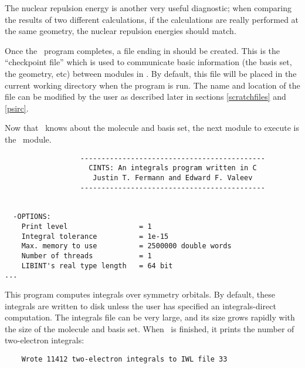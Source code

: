 The nuclear repulsion energy is another very useful diagnostic; when
comparing the results of two different calculations, if the calculations
are really performed at the same geometry, the nuclear repulsion energies
should match.

Once the \PSIinput\ program completes, a file ending in  should
be created.  This is the ``checkpoint file'' which is used to communicate
basic information (the basis set, the geometry, etc) between modules
in \PSIthree.  By default, this file will be placed in the current working
directory when the program is run.  The name and location of the file can
be modified by the user as described later in sections \ref{scratchfiles}
and \ref{psirc}.

Now that \PSIthree\ knows about the molecule and basis set, the next
module to execute is the \PSIcints\ module.  
\begin{verbatim}
                  --------------------------------------------
                    CINTS: An integrals program written in C
                     Justin T. Fermann and Edward F. Valeev
                  --------------------------------------------
                                                                                
                                                                                
  -OPTIONS:
    Print level                 = 1
    Integral tolerance          = 1e-15
    Max. memory to use          = 2500000 double words
    Number of threads           = 1
    LIBINT's real type length   = 64 bit
...
\end{verbatim}
This program computes
integrals over symmetry orbitals.  By default, these integrals are
written to disk unless the user has specified an integrals-direct
computation.  The integrals file can be very large, and its size grows
rapidly with the size of the molecule and basis set.  When \PSIcints\ 
is finished, it prints the number of two-electron integrals:
\begin{verbatim}
    Wrote 11412 two-electron integrals to IWL file 33
\end{verbatim}

